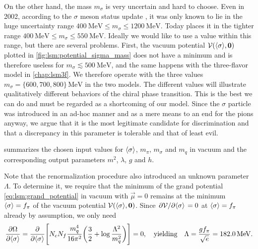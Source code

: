 On the other hand, the mass $m_\sigma$ is very uncertain and hard to choose.
Even in 2002, according to the $\sigma$ meson status update \cite{ref:sigma_meson_status},
it was only known to lie in the huge uncertainty range $\SI{400}{\mega\electronvolt} \leq m_\sigma \leq \SI{1200}{\mega\electronvolt}$.
Today \cite{ref:pdg_review_2021} places it in the tighter range $\SI{400}{\mega\electronvolt} \leq m_\sigma \leq \SI{550}{\mega\electronvolt}$.
Ideally we would like to use a value within this range, but there are several problems.
First, the vacuum potential $\mathcal{V}(\langle \sigma \rangle,{\bm{0}})$ plotted in \cref{fig:lsm:potential_sigma_mass} does not have a minimum and is therefore useless for $m_\sigma \lesssim \SI{500}{\mega\electronvolt}$,
and the same happens with the three-flavor model in \cref{chap:lsm3f}.
We therefore operate with the three values $m_\sigma = \{600,700,800\} \, \si{\mega\electronvolt}$ in the two models.
The different values will illustrate qualitatively different behaviors of the chiral phase transition.
This is the best we can do and must be regarded as a shortcoming of our model.
Since the $\sigma$ particle was introduced in an ad-hoc manner and as a mere means to an end for the pions anyway,
we argue that it is the most legitimate candidate for discrimination
and that a discrepancy in this parameter is tolerable and that of least evil.

 summarizes the chosen input values for $\langle \sigma \rangle$, $m_\pi$, $m_\sigma$ and $m_q$ in vacuum and the corresponding output parameters $m^2$, $\lambda$, $g$ and $h$.

Note that the renormalization procedure also introduced an unknown parameter $\Lambda$.
To determine it, we require that the minimum of the grand potential \eqref{eq:lsm:grand_potential} in vacuum with $\vec{\mu}=0$
remains at the minimum $\langle \sigma \rangle = f_\pi$ of the vacuum potential $\mathcal{V}(\langle \sigma \rangle,{\bm{0}})$.
Since $\pdv{\mathcal{V}}/{\langle \sigma \rangle} = 0$ at $\langle \sigma \rangle=f_\pi$ already by assumption, we only need
\begin{equation}
	\pdv{\Omega}{ \langle \sigma \rangle} =
	\pdv*{\Bigg[ N_c N_f \frac{m_q^4}{16 \pi^2} \bigg( \frac32 + \log \frac{\Lambda^2}{m_q^2} \bigg) \Bigg] }{\langle \sigma \rangle} = 0,
	\quad \text{yielding} \quad
	\Lambda = \frac{g f_\pi}{\sqrt{e}} = \SI{182.0}{\mega\electronvolt}.
\label{eq:lsm:potential_vacuum_minimum}
\end{equation}

